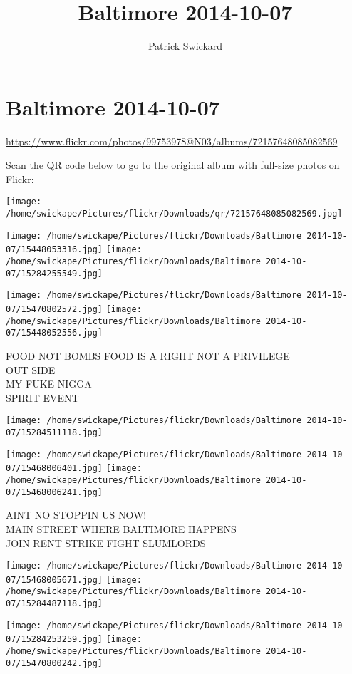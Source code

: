 \documentclass[10pt,letterpaper]{article}
\title{Baltimore 2014-10-07}
\author{Patrick Swickard}
\date{}
\begin{document}
\section*{Baltimore 2014-10-07}

\url{https://www.flickr.com/photos/99753978@N03/albums/72157648085082569}

Scan the QR code below to go to the original album with full-size photos on Flickr:

\texttt{[image: /home/swickape/Pictures/flickr/Downloads/qr/72157648085082569.jpg]}
\pagebreak

\texttt{[image: /home/swickape/Pictures/flickr/Downloads/Baltimore 2014-10-07/15448053316.jpg]}
\texttt{[image: /home/swickape/Pictures/flickr/Downloads/Baltimore 2014-10-07/15284255549.jpg]}

\texttt{[image: /home/swickape/Pictures/flickr/Downloads/Baltimore 2014-10-07/15470802572.jpg]}
\texttt{[image: /home/swickape/Pictures/flickr/Downloads/Baltimore 2014-10-07/15448052556.jpg]}

FOOD NOT BOMBS FOOD IS A RIGHT NOT A PRIVILEGE\\
OUT SIDE\\
MY FUKE NIGGA\\
SPIRIT EVENT
\pagebreak

\texttt{[image: /home/swickape/Pictures/flickr/Downloads/Baltimore 2014-10-07/15284511118.jpg]}

\vspace{0.25in}
\texttt{[image: /home/swickape/Pictures/flickr/Downloads/Baltimore 2014-10-07/15468006401.jpg]}
\texttt{[image: /home/swickape/Pictures/flickr/Downloads/Baltimore 2014-10-07/15468006241.jpg]}

AINT NO STOPPIN US NOW!\\
MAIN STREET WHERE BALTIMORE HAPPENS\\
JOIN RENT STRIKE FIGHT SLUMLORDS
\pagebreak

\texttt{[image: /home/swickape/Pictures/flickr/Downloads/Baltimore 2014-10-07/15468005671.jpg]}
\texttt{[image: /home/swickape/Pictures/flickr/Downloads/Baltimore 2014-10-07/15284487118.jpg]}

\texttt{[image: /home/swickape/Pictures/flickr/Downloads/Baltimore 2014-10-07/15284253259.jpg]}
\texttt{[image: /home/swickape/Pictures/flickr/Downloads/Baltimore 2014-10-07/15470800242.jpg]}
\end{document}

